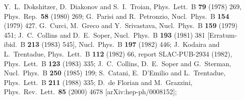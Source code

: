 \documentclass[12pt]{article}
\begin{document}
\begin{thebibliography}{99}
  
Y.~L.~Dokshitzer, D.~Diakonov and S.~I.~Troian,
Phys.\ Lett.\  B {\bf 79} (1978) 269,
Phys.\ Rep.\  {\bf 58} (1980) 269;
G.~Parisi and R.~Petronzio,
Nucl.\ Phys.\ B {\bf 154} (1979) 427.
G.~Curci, M.~Greco and Y.~Srivastava,
Nucl.\ Phys.\ B {\bf 159} (1979) 451;
J.~C.~Collins and D.~E.~Soper,
Nucl.\ Phys.\ B {\bf 193} (1981) 381
[Erratum-ibid.\ B {\bf 213} (1983) 545],
Nucl.\ Phys.\ B {\bf 197} (1982) 446;
J.~Kodaira and L.~Trentadue,
Phys.\ Lett.\ B {\bf 112} (1982) 66,
report SLAC-PUB-2934 (1982),
Phys.\ Lett.\ B {\bf 123} (1983) 335;
J.~C.~Collins, D.~E.~Soper and G.~Sterman,
Nucl.\ Phys.\ B {\bf 250} (1985) 199;
S.~Catani, E.~D'Emilio and L.~Trentadue,
Phys.\ Lett.\ B {\bf 211} (1988) 335;
  D.~de Florian and M.~Grazzini,
  Phys.\ Rev.\ Lett.\  {\bf 85} (2000) 4678
[arXiv:hep-ph/0008152];


\end{thebibliography}
\end{document}
